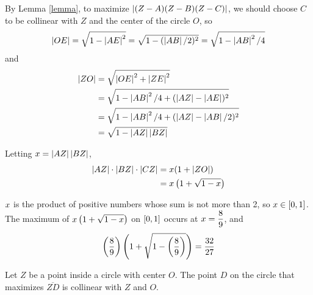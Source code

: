 By Lemma \ref{lemma}, to maximize $\displaystyle \left|  (Z-A)(Z-B)(Z-C) \right|$, we should choose $C$ to be collinear with $Z$ and the center of the circle $O$, so
\[
  \left| OE \right| = \sqrt{1-\left| AE \right|^2} = \sqrt{1 - (\left| AB \right|/2)^2} = \sqrt{1-\left| AB \right|^2/4}
\]
and
\begin{align*}
 \left| ZO \right| &= \sqrt{\left| OE \right|^2 + \left| ZE \right|^2} \\
 &= \sqrt{1-\left| AB \right|^2/4 + (\left| AZ \right| - \left| AE \right|)^2} \\
 &=  \sqrt{1-\left| AB \right|^2/4 + (\left| AZ \right| - \left| AB \right|/2)^2} \\
 &= \sqrt{1-\left| AZ \right|\left| BZ \right|}
\end{align*}

Letting $\displaystyle x = \left| AZ \right|\left| BZ \right|$, 
\begin{align*}
  \left| AZ \right|\cdot \left| BZ \right|\cdot\left| CZ \right| &= x (1+\left| ZO \right|) \\
  &= x\left( 1+\sqrt{1-x} \right)
\end{align*}

$\displaystyle x$ is the product of positive numbers whose sum is not more than 2, so $\displaystyle x\in [0,1]$. The maximum of $\displaystyle x\left( 1+\sqrt{1-x} \right)$ on $\displaystyle [0,1]$ occurs at $\displaystyle x = \frac{8}{9}$, and 
\[
  \left( \frac{8}{9} \right) \left( 1+\sqrt{1-\left( \frac{8}{9} \right)} \right) = \frac{32}{27}
\]

\begin{lemma} \label{lemma} Let $Z$ be a point inside a circle with center $O$. The point $D$ on the circle that maximizes $\overline{Z D}$ is collinear with $Z$ and $O$.
\end{lemma}

